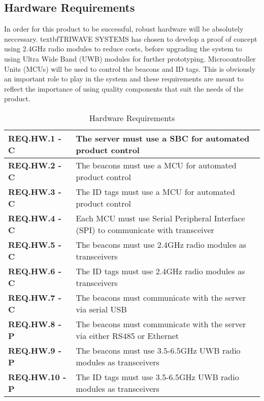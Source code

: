 \subsection{Hardware Requirements}
In order for this product to be successful, robust hardware will be absolutely neccessary.  textbf{TRIWAVE SYSTEMS} has chosen to develop a proof of concept using 2.4GHz radio modules to reduce costs, before upgrading the system to using Ultra Wide Band (UWB) modules for further prototyping. Microcontroller Units (MCUs) will be used to control the beacons and ID tags. This is obviously an important role to play in the system and these requirements are meant to reflect the importance of using quality components that suit the needs of the product.
\bgroup
\def\arraystretch{1.5}
\begin{table}[H]
\centering
\begin{tabular}{ | m{3.5cm} | m{12.5cm} | }
 \hline
 \textbf{ REQ.HW.1 - C } & The server must use a SBC for automated product control \\
\hline
 \textbf{ REQ.HW.2 - C } & The beacons must use a MCU for automated product control \\
\hline
 \textbf{ REQ.HW.3 - C } & The ID tags must use a MCU for automated product control \\
\hline
 \textbf{ REQ.HW.4 - C} & Each MCU must use Serial Peripheral Interface (SPI) to communicate with transceiver \\
\hline
 \textbf{ REQ.HW.5 - C } & The beacons must use 2.4GHz radio modules as transceivers \\
\hline
 \textbf{ REQ.HW.6 - C } & The ID tags must use 2.4GHz radio modules as transceivers  \\
\hline
 \textbf{ REQ.HW.7 - C } & The beacons must communicate with the server via serial  USB \\
\hline
 \textbf{ REQ.HW.8 - P } &The beacons must communicate with the server via either RS485 or Ethernet  \\
\hline
 \textbf{ REQ.HW.9 - P } & The beacons must use 3.5-6.5GHz UWB radio modules as transceivers \\
\hline
 \textbf{ REQ.HW.10 - P } & The ID tags must use 3.5-6.5GHz UWB radio modules as transceivers \\
\hline
\end{tabular}
\caption{Hardware Requirements}
\end{table}

\break
